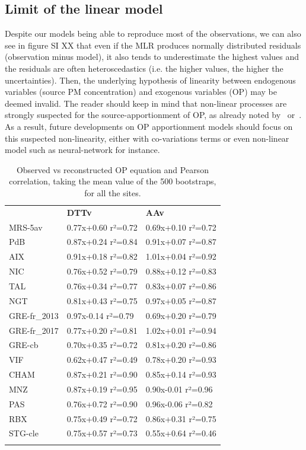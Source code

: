 \documentclass[acp]{copernicus}
\begin{document}
\subsection{Limit of the linear model}%
\label{limit-of-the-linear-model}

Despite our models being able to reproduce most of the observations, we
can also see in figure SI XX that even if the MLR produces normally
distributed residuals (observation minus model), it also tends to
underestimate the highest values and the residuals are often
heteroscedastics (i.e. the higher values, the higher the uncertainties).
Then, the underlying hypothesis of linearity between endogenous
variables (source PM concentration) and exogenous variables (OP) may be
deemed invalid. The reader should keep in mind that non-linear processes
are strongly suspected for the source-apportionment of OP, as already
noted by~\citet{calasComparison2018} or~\citet{charrierBias2016}. As a result,
future developments on OP apportionment models should focus on this
suspected non-linearity, either with co-variations terms or even
non-linear model such as neural-network for instance.

\begin{table}[ht]
    \centering
    \caption{
    Observed vs reconstructed OP equation and Pearson correlation, taking the mean value
    of the 500 bootstraps, for all the sites.
    }
    \label{tab:tab2}
    \begin{tabular}{lll}
\tophline
    & \textbf{DTTv} & \textbf{AAv}\\
\middlehline
MRS-5av      & 0.77x+0.60 r²=0.72 & 0.69x+0.10 r²=0.72\\
PdB          & 0.87x+0.24 r²=0.84 & 0.91x+0.07 r²=0.87\\
AIX          & 0.91x+0.18 r²=0.82 & 1.01x+0.04 r²=0.92\\
NIC          & 0.76x+0.52 r²=0.79 & 0.88x+0.12 r²=0.83\\
TAL          & 0.76x+0.34 r²=0.77 & 0.83x+0.07 r²=0.86\\
NGT          & 0.81x+0.43 r²=0.75 & 0.97x+0.05 r²=0.87\\
GRE-fr\_2013 & 0.97x-0.14 r²=0.79 & 0.69x+0.20 r²=0.79\\
GRE-fr\_2017 & 0.77x+0.20 r²=0.81 & 1.02x+0.01 r²=0.94\\
GRE-cb       & 0.70x+0.35 r²=0.72 & 0.81x+0.20 r²=0.86\\
VIF          & 0.62x+0.47 r²=0.49 & 0.78x+0.20 r²=0.93\\
CHAM         & 0.87x+0.21 r²=0.90 & 0.85x+0.14 r²=0.93\\
MNZ          & 0.87x+0.19 r²=0.95 & 0.90x-0.01 r²=0.96\\
PAS          & 0.76x+0.72 r²=0.90 & 0.96x-0.06 r²=0.82\\
RBX          & 0.75x+0.49 r²=0.72 & 0.86x+0.31 r²=0.75\\
STG-cle      & 0.75x+0.57 r²=0.73 & 0.55x+0.64 r²=0.46\\
\bottomhline
    \end{tabular}
\end{table}
\end{document}
